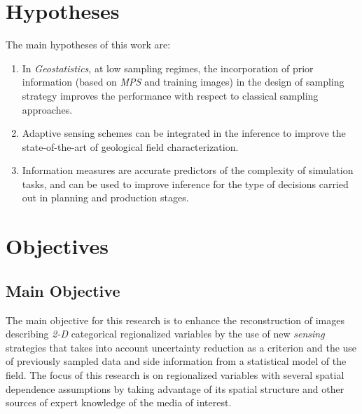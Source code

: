 

\section{Hypotheses}

The main hypotheses of this  work are:

\begin{enumerate}
	\item In \emph{Geostatistics}, at low sampling regimes, the incorporation of prior information (based on \emph{MPS} and training images) in the design of sampling strategy improves the performance with respect to classical sampling approaches.
	
	
	\item Adaptive sensing schemes can be integrated in the inference to improve the state-of-the-art of geological field characterization.
	
    
     \item Information measures are accurate predictors of the complexity of simulation tasks, and can be used to improve inference for the type of decisions carried out in planning and production stages.

\end{enumerate}



\section{Objectives}

\subsection{Main Objective}
\label{sec_Main_Obj}

The main objective for this research is to enhance the reconstruction of images describing \emph{2-D} categorical regionalized variables by the use of new \emph{sensing} strategies that takes into account uncertainty reduction as a criterion and the use of previously sampled data and side information from a statistical model of the field. The focus of this research is on regionalized variables with several spatial dependence assumptions by taking advantage of its spatial structure and other sources of expert knowledge of the media of interest. 

